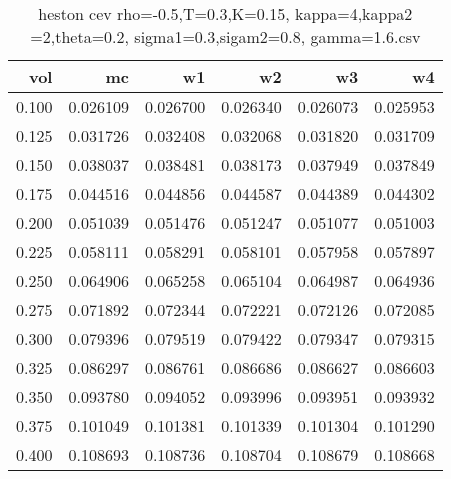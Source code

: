 \begin{table}
  \centering
  \caption{heston cev rho=-0.5,T=0.3,K=0.15, kappa=4,kappa2 =2,theta=0.2, sigma1=0.3,sigam2=0.8, gamma=1.6.csv}
  \begin{tabular}{rrrrrr}
  \toprule
    vol &       mc &       w1 &       w2 &       w3 &       w4 \\
  \midrule
  0.100 & 0.026109 & 0.026700 & 0.026340 & 0.026073 & 0.025953 \\
  0.125 & 0.031726 & 0.032408 & 0.032068 & 0.031820 & 0.031709 \\
  0.150 & 0.038037 & 0.038481 & 0.038173 & 0.037949 & 0.037849 \\
  0.175 & 0.044516 & 0.044856 & 0.044587 & 0.044389 & 0.044302 \\
  0.200 & 0.051039 & 0.051476 & 0.051247 & 0.051077 & 0.051003 \\
  0.225 & 0.058111 & 0.058291 & 0.058101 & 0.057958 & 0.057897 \\
  0.250 & 0.064906 & 0.065258 & 0.065104 & 0.064987 & 0.064936 \\
  0.275 & 0.071892 & 0.072344 & 0.072221 & 0.072126 & 0.072085 \\
  0.300 & 0.079396 & 0.079519 & 0.079422 & 0.079347 & 0.079315 \\
  0.325 & 0.086297 & 0.086761 & 0.086686 & 0.086627 & 0.086603 \\
  0.350 & 0.093780 & 0.094052 & 0.093996 & 0.093951 & 0.093932 \\
  0.375 & 0.101049 & 0.101381 & 0.101339 & 0.101304 & 0.101290 \\
  0.400 & 0.108693 & 0.108736 & 0.108704 & 0.108679 & 0.108668 \\
  \bottomrule
  \end{tabular}
  \end{table}

